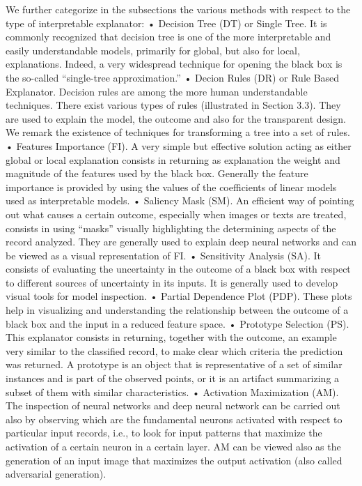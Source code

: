 We further categorize in the subsections the various methods with respect to the type of interpretable explanator:
• Decision Tree (DT) or Single Tree. It is commonly recognized that decision tree is one of
the more interpretable and easily understandable models, primarily for global, but also for
local, explanations. Indeed, a very widespread technique for opening the black box is the
so-called “single-tree approximation.”
• Decion Rules (DR) or Rule Based Explanator. Decision rules are among the more human understandable techniques. There exist various types of rules (illustrated in Section 3.3). They
are used to explain the model, the outcome and also for the transparent design. We remark
the existence of techniques for transforming a tree into a set of rules.
• Features Importance (FI). A very simple but effective solution acting as either global or local
explanation consists in returning as explanation the weight and magnitude of the features
used by the black box. Generally the feature importance is provided by using the values of
the coefficients of linear models used as interpretable models.
• Saliency Mask (SM). An efficient way of pointing out what causes a certain outcome, especially when images or texts are treated, consists in using “masks” visually highlighting the
determining aspects of the record analyzed. They are generally used to explain deep neural
networks and can be viewed as a visual representation of FI.
• Sensitivity Analysis (SA). It consists of evaluating the uncertainty in the outcome of a black
box with respect to different sources of uncertainty in its inputs. It is generally used to
develop visual tools for model inspection.
• Partial Dependence Plot (PDP). These plots help in visualizing and understanding the relationship between the outcome of a black box and the input in a reduced feature space.
• Prototype Selection (PS). This explanator consists in returning, together with the outcome,
an example very similar to the classified record, to make clear which criteria the prediction
was returned. A prototype is an object that is representative of a set of similar instances and
is part of the observed points, or it is an artifact summarizing a subset of them with similar
characteristics.
• Activation Maximization (AM). The inspection of neural networks and deep neural network
can be carried out also by observing which are the fundamental neurons activated with respect to particular input records, i.e., to look for input patterns that maximize the activation
of a certain neuron in a certain layer. AM can be viewed also as the generation of an input
image that maximizes the output activation (also called adversarial generation).

